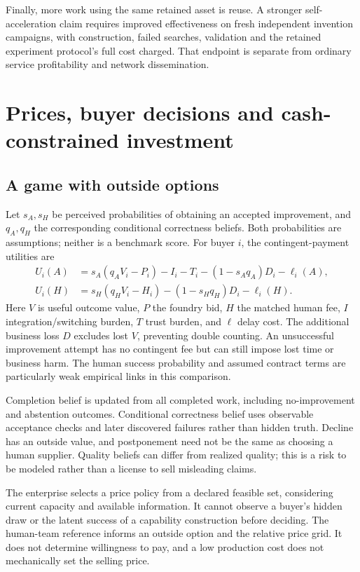 \documentclass[11pt,a4paper]{article}
\begin{document}
Finally, more work using the same retained asset is reuse. A stronger self-acceleration claim requires improved effectiveness on fresh independent invention campaigns, with construction, failed searches, validation and the retained experiment protocol's full cost charged. That endpoint is separate from ordinary service profitability and network dissemination.

\section{Prices, buyer decisions and cash-constrained investment}

\subsection{A game with outside options}

Let $s_A,s_H$ be perceived probabilities of obtaining an accepted improvement, and $q_A,q_H$ the corresponding conditional correctness beliefs. Both probabilities are assumptions; neither is a benchmark score. For buyer $i$, the contingent-payment utilities are
\begin{align}
 U_i(A)&=s_A(q_A V_i-P_i)-I_i-T_i-(1-s_Aq_A)D_i-\ell_i(A),\\
 U_i(H)&=s_H(q_H V_i-H_i)-(1-s_Hq_H)D_i-\ell_i(H).
\end{align}
Here $V$ is useful outcome value, $P$ the foundry bid, $H$ the matched human fee, $I$ integration/switching burden, $T$ trust burden, and $\ell$ delay cost. The additional business loss $D$ excludes lost $V$, preventing double counting. An unsuccessful improvement attempt has no contingent fee but can still impose lost time or business harm. The human success probability and assumed contract terms are particularly weak empirical links in this comparison.

Completion belief is updated from all completed work, including no-improvement and abstention outcomes. Conditional correctness belief uses observable acceptance checks and later discovered failures rather than hidden truth. Decline has an outside value, and postponement need not be the same as choosing a human supplier. Quality beliefs can differ from realized quality; this is a risk to be modeled rather than a license to sell misleading claims.

The enterprise selects a price policy from a declared feasible set, considering current capacity and available information. It cannot observe a buyer's hidden draw or the latent success of a capability construction before deciding. The human-team reference informs an outside option and the relative price grid. It does not determine willingness to pay, and a low production cost does not mechanically set the selling price.
\end{document}
